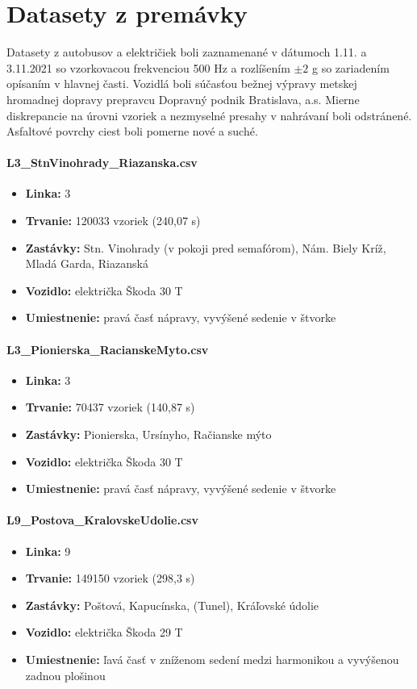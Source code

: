 \section{Datasety z premávky}
Datasety z autobusov a električiek boli zaznamenané v dátumoch 1.11. a 3.11.2021 so vzorkovacou frekvenciou 500 Hz 
a rozlíšením $\pm 2$ g so zariadením opísaním v hlavnej časti. Vozidlá boli súčasťou bežnej výpravy metskej 
hromadnej dopravy prepravcu Dopravný podnik Bratislava, a.s. Mierne diskrepancie na úrovni vzoriek a nezmyselné 
presahy v nahrávaní boli odstránené. Asfaltové povrchy ciest boli pomerne nové a suché.

\paragraph{L3\_StnVinohrady\_Riazanska.csv}
\begin{itemize}[noitemsep, topsep=0pt]
  	\item \textbf{Linka:} 3
  	\item \textbf{Trvanie:} 120033 vzoriek (240,07 s)
  	\item \textbf{Zastávky:} Stn. Vinohrady (v pokoji pred semafórom), Nám. Biely Kríž, Mladá Garda, Riazanská
  	\item \textbf{Vozidlo:} električka Škoda 30 T
	\item \textbf{Umiestnenie:} pravá časť nápravy, vyvýšené sedenie v štvorke
\end{itemize}

\paragraph{L3\_Pionierska\_RacianskeMyto.csv}
\begin{itemize}[noitemsep, topsep=0pt]
  	\item \textbf{Linka:} 3
  	\item \textbf{Trvanie:} 70437 vzoriek (140,87 s)
  	\item \textbf{Zastávky:} Pionierska, Ursínyho, Račianske mýto
  	\item \textbf{Vozidlo:} električka Škoda 30 T
  	\item \textbf{Umiestnenie:} pravá časť nápravy, vyvýšené sedenie v štvorke
\end{itemize}

\paragraph{L9\_Postova\_KralovskeUdolie.csv}
\begin{itemize}[noitemsep, topsep=0pt]
  	\item \textbf{Linka:} 9
  	\item \textbf{Trvanie:} 149150 vzoriek (298,3 s)
  	\item \textbf{Zastávky:} Poštová, Kapucínska, (Tunel), Kráľovské údolie
  	\item \textbf{Vozidlo:} električka Škoda 29 T
  	\item \textbf{Umiestnenie:} ľavá časť v zníženom sedení medzi harmonikou a vyvýšenou zadnou plošinou
\end{itemize}
  		
